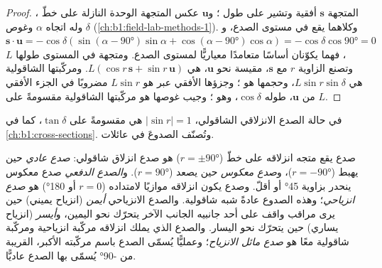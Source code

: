 \begin{proof}
المتجهة $\mathbf s$ أفقية وتشير على طول ؛ و$\mathbf u$ عكس المتجهة الوحدة النازلة على خطّ ، وله اتجاه $\alpha$ وغوص $\delta$ (\cref{ch:b1:field-lab-methods-1}). وكلاهما يقع في مستوى الصدع، و$\mathbf s\cdot\mathbf u = -\cos\delta(\sin(\alpha -
\ang{90})\sin\alpha + \cos(\alpha - \ang{90})\cos\alpha) = -\cos\delta\cos\ang{90} = 0$،
فهما يكوّنان أساسًا متعامدًا معياريًّا لمستوى الصدع. ومتجهة في المستوى طولها $L$ وتصنع الزاوية $r$ مع $\mathbf s$، مقيسة نحو $\mathbf u$، هي
$L(\cos r\,\mathbf s + \sin r\,\mathbf u)$. ومركّبتها الشاقولية هي
$L\sin r\sin\delta$، وحجمها هو ؛ وجزؤها الأفقي عبر
 هو $L\sin r$ مضروبًا في الجزء الأفقي من $\mathbf u$، طوله
$\cos\delta$، وهو ؛ وجيب غوصها هو مركّبتها الشاقولية مقسومةً على $L$.
\end{proof}

في حالة الصدع الانزلاقي الشاقولي، $|\sin r| = 1$  هي  مقسومةً على $\tan\delta$، كما في \cref{ch:b1:cross-sections}. وتُصنّف  الصدوعَ في عائلات.

\begin{definition}\label{def:b1:faults-folds-fabrics:fault-types}
صدع يقع متجه انزلاقه على خطّ  ($r = \pm\ang{90}$) هو صدع انزلاق شاقولي: \emph{صدع عادي} حين يهبط  ($r = \ang{-90}$)، و\emph{صدع معكوس} حين يصعد ($r = \ang{90}$). و\emph{الصدع الدفعي} صدع معكوس ينحدر بزاوية \ang{45} أو أقلّ. وصدع يكون انزلاقه موازيًا لامتداده ($r = 0$ أو \ang{180}) هو \emph{صدع انزياحي}؛ وهذه الصدوع عادةً شبه شاقولية. والصدع الانزياحي \emph{أيمن} (انزياح يميني) حين يرى مراقب واقف على أحد جانبيه الجانب الآخر يتحرّك نحو اليمين، و\emph{أيسر} (انزياح يساري) حين يتحرّك نحو اليسار. والصدع الذي يملك انزلاقه مركّبة انزياحية ومركّبة شاقولية معًا هو \emph{صدع مائل الانزياح}؛ وعمليًّا يُسمّى الصدع باسم مركّبته الأكبر،  القريبة من \ang{-90} يُسمّى بها الصدع عاديًّا.
\end{definition}


